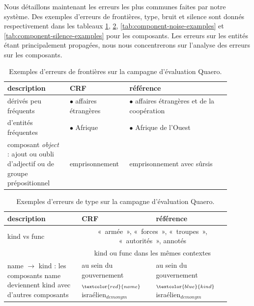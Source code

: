 \documentclass[12pt,a4paper,times,twoside,openright]{report}
\begin{document}
Nous détaillons maintenant les erreurs les plus communes faites par notre système. Des exemples d'erreurs de frontières, type, bruit et silence sont donnés respectivement dans les tableaux \ref{tab:component-boundary-examples}, \ref{tab:component-type-examples}, \ref{tab:component-noise-examples} et  \ref{tab:component-silence-examples} pour les composants. Les erreurs sur les entités étant principalement propagées, nous nous concentrerons sur l'analyse des erreurs sur les composants.

\begin{table}[ht!]
\centering
\small
\begin{tabular}{|p{0.26\linewidth}|p{0.22\linewidth}|p{0.42\linewidth}|}
\hline
description                                                 & CRF & référence \\
\hline
dérivés peu fréquents & $\bullet$ affaires étrangères & $\bullet$ affaires étrangères et de la coopération \\
d'entités fréquentes  & $\bullet$ Afrique             & $\bullet$ Afrique de l'Ouest \\
\hline
composant \textit{object} : ajout ou oubli d'adjectif ou de groupe prépositionnel & emprisonnement & emprisonnement avec sûrsis \\
\hline
\end{tabular}
\caption{Exemples d'erreurs de frontières sur la campagne d'évaluation Quaero.}
\label{tab:component-boundary-examples}
\end{table}

\begin{table}[ht!]
\centering
\begin{tabular}{|p{0.3\linewidth}|p{0.3\linewidth}|p{0.3\linewidth}|}
\hline
description                                                 & CRF & référence \\
\hline
kind vs func                                                                             & \multicolumn{2}{c|}{«~armée~», «~forces~», «~troupes~», «~autorités~», annotés} \\
                                                                                         & \multicolumn{2}{c|}{kind ou func dans les mêmes contextes} \\
\hline
name $\rightarrow$ kind : les composants name deviennent kind avec d'autres composants   & au sein du gouvernement$_{\textcolor{red}{name}}$ israélien$_{demonym}$ & au sein du gouvernement$_{\textcolor{blue}{kind}}$ israélien$_{demonym}$ \\
\hline
\end{tabular}
\caption{Exemples d'erreurs de type sur la campagne d'évaluation Quaero.}
\label{tab:component-type-examples}
\end{table}
\end{document}
